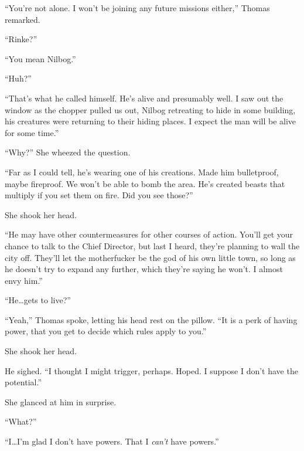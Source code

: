 ``You're not alone.  I won't be joining any future missions either,'' Thomas remarked.



``Rinke?''



``You mean Nilbog.''



``Huh?''



``That's what he called himself.  He's alive and presumably well.  I saw out the window as the chopper pulled us out, Nilbog retreating to hide in some building, his creatures were returning to their hiding places.  I expect the man will be alive for some time.''



``Why?'' She wheezed the question.



``Far as I could tell, he's wearing one of his creations.  Made him bulletproof, maybe fireproof.  We won't be able to bomb the area.  He's created beasts that multiply if you set them on fire.  Did you see those?''



She shook her head.



``He may have other countermeasures for other courses of action.  You'll get your chance to talk to the Chief Director, but last I heard, they're planning to wall the city off.  They'll let the motherfucker be the god of his own little town, so long as he doesn't try to expand any further, which they're saying he won't.  I almost envy him.''



``He\ldots gets to live?''



``Yeah,'' Thomas spoke, letting his head rest on the pillow.  ``It is a perk of having power, that you get to decide which rules apply to you.''



She shook her head.



He sighed.  ``I thought I might trigger, perhaps.  Hoped.  I suppose I don't have the potential.''



She glanced at him in surprise.



``What?''



``I\ldots I'm glad I don't have powers.  That I \emph{can't} have powers.''



